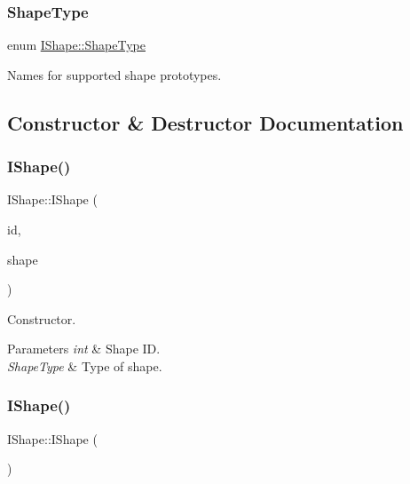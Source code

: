 \subsubsection{\texorpdfstring{ShapeType}{ShapeType}}
{\footnotesize\ttfamily enum \mbox{\hyperlink{class_i_shape_a8f50993477b5ddb44c0547ef3d547cdc}{I\+Shape\+::\+Shape\+Type}}\hspace{0.3cm}{\ttfamily [strong]}}



Names for supported shape prototypes. 



\subsection{Constructor \& Destructor Documentation}
\mbox{\label{class_i_shape_a236c00619f1fa2eaab6c4ce85a2375aa}} 
\subsubsection{\texorpdfstring{IShape()}{IShape()}\hspace{0.1cm}{\footnotesize\ttfamily [1/2]}}
{\footnotesize\ttfamily I\+Shape\+::\+I\+Shape (\begin{DoxyParamCaption}\item[{int}]{id,  }\item[{\mbox{\hyperlink{class_i_shape_a8f50993477b5ddb44c0547ef3d547cdc}{Shape\+Type}}}]{shape }\end{DoxyParamCaption})}



Constructor. 


\begin{DoxyParams}{Parameters}
{\em int} & Shape ID. \\
\hline
{\em Shape\+Type} & Type of shape. \\
\hline
\end{DoxyParams}
\mbox{\label{class_i_shape_a0671306e1665998f9c6652cf1ef1a74e}} 
\subsubsection{\texorpdfstring{IShape()}{IShape()}\hspace{0.1cm}{\footnotesize\ttfamily [2/2]}}
{\footnotesize\ttfamily I\+Shape\+::\+I\+Shape (\begin{DoxyParamCaption}\item[{const \mbox{\hyperlink{class_i_shape}{I\+Shape}} \&}]{ }\end{DoxyParamCaption})\hspace{0.3cm}{\ttfamily [delete]}}



